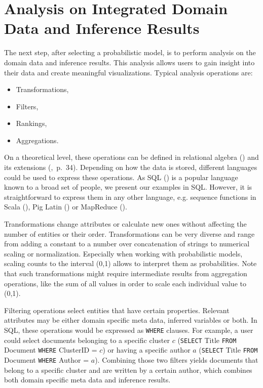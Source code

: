 \section{Analysis on Integrated Domain Data and Inference Results}

The next step, after selecting a probabilistic model, is to perform analysis on the domain data and inference results. This analysis allows users to gain insight into their data and create meaningful visualizations. Typical analysis operations are:
\begin{itemize}
\item Transformations,
\item Filters,
\item Rankings,
\item Aggregations.
\end{itemize} On a theoretical level, these operations can be defined in relational algebra (\cite{ozsoyouglu1987extending, klug1982equivalence}) and its extensions (\cite{rajaraman2011mining},~p.~34). Depending on how the data is stored, different languages could be used to express these operations. As SQL (\cite{iso2011sql}) is a popular language known to a broad set of people, we present our examples in SQL. However, it is straightforward to express them in any other language, e.g. sequence functions in Scala (\cite{odersky2008programming}), Pig Latin (\cite{gates2011programming}) or MapReduce (\cite{dean2008mapreduce}).

Transformations change attributes or calculate new ones without affecting the number of entities or their order. Transformations can be very diverse and range from adding a constant to a number over concatenation of strings to numerical scaling or normalization. Especially when working with probabilistic models, scaling counts to the interval (0,1) allows to interpret them as probabilities. Note that such transformations might require intermediate results from aggregation operations, like the sum of all values in order to scale each individual value to (0,1).

Filtering operations select entities that have certain properties. Relevant attributes may be either domain specific meta data, inferred variables or both. In SQL, these operations would be expressed as \texttt{WHERE} clauses. For example, a user could select documents belonging to a specific cluster $c$ (\texttt{SELECT} Title \texttt{FROM} Document \texttt{WHERE} ClusterID = $c$) or having a specific author $a$ (\texttt{SELECT} Title \texttt{FROM} Document \texttt{WHERE} Author = $a$). Combining those two filters yields documents that belong to a specific cluster and are written by a certain author, which combines both domain specific meta data and inference results.

